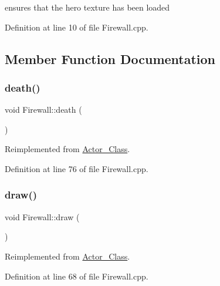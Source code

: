 ensures that the hero texture has been loaded 

Definition at line 10 of file Firewall.\+cpp.



\subsection{Member Function Documentation}
\hypertarget{class_firewall_a506013f97478b8937becdac038c45c8e}{}\label{class_firewall_a506013f97478b8937becdac038c45c8e} 
\subsubsection{\texorpdfstring{death()}{death()}}
{\footnotesize\ttfamily void Firewall\+::death (\begin{DoxyParamCaption}{ }\end{DoxyParamCaption})\hspace{0.3cm}{\ttfamily [virtual]}}



Reimplemented from \hyperlink{class_actor___class_a9447c6154a674d7e6bdf24ff2874b7a8}{Actor\+\_\+\+Class}.



Definition at line 76 of file Firewall.\+cpp.

\hypertarget{class_firewall_a3e67e39efb0a425acd1f009f86e434ee}{}\label{class_firewall_a3e67e39efb0a425acd1f009f86e434ee} 
\subsubsection{\texorpdfstring{draw()}{draw()}}
{\footnotesize\ttfamily void Firewall\+::draw (\begin{DoxyParamCaption}{ }\end{DoxyParamCaption})\hspace{0.3cm}{\ttfamily [virtual]}}



Reimplemented from \hyperlink{class_actor___class_ac49cd62be76b4b950ecbe155413f1b64}{Actor\+\_\+\+Class}.



Definition at line 68 of file Firewall.\+cpp.

\hypertarget{class_firewall_a21c3c46eaf7bb026b73a77b0288fa232}{}\label{class_firewall_a21c3c46eaf7bb026b73a77b0288fa232} 
